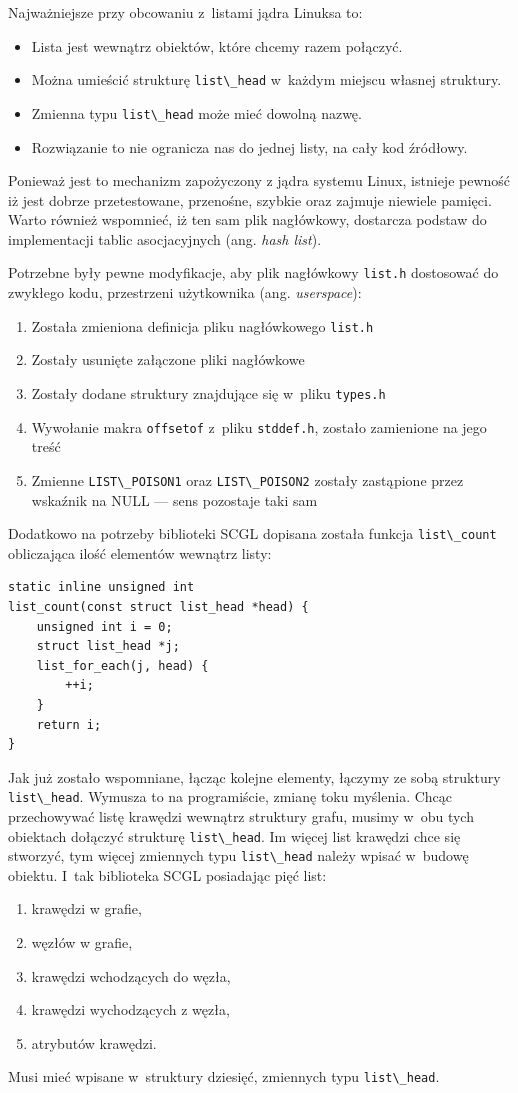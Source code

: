 \documentclass[a4paper,12pt,polish,oneside]{thesis}
\newcommand\code[1]{\lstinline[style=line]{#1}}
\begin{document}
Najważniejsze przy obcowaniu z~listami jądra Linuksa to:
\begin{itemize}
	\item Lista jest wewnątrz obiektów, które chcemy razem połączyć.
	\item Można umieścić strukturę \code{list\_head} w~każdym miejscu własnej struktury.
	\item Zmienna typu \code{list\_head} może mieć dowolną nazwę.
	\item Rozwiązanie to nie ogranicza nas do jednej listy, na cały kod źródłowy.
\end{itemize}
Ponieważ jest to mechanizm zapożyczony z jądra systemu Linux, istnieje pewność iż jest dobrze przetestowane, przenośne, szybkie oraz zajmuje niewiele pamięci.
Warto również wspomnieć, iż ten sam plik nagłówkowy, dostarcza podstaw do implementacji tablic asocjacyjnych (ang. \emph{hash list}).

Potrzebne były pewne modyfikacje, aby plik nagłówkowy \code{list.h} dostosować do zwykłego kodu, przestrzeni użytkownika (ang. \emph{userspace}):
\begin{enumerate}
	\item Została zmieniona definicja pliku nagłówkowego \code{list.h}
	\item Zostały usunięte załączone pliki nagłówkowe
	\item Zostały dodane struktury znajdujące się w~pliku \code{types.h}
	\item Wywołanie makra \code{offsetof} z~pliku \code{stddef.h}, zostało zamienione na jego treść
	\item Zmienne \code{LIST\_POISON1} oraz \code{LIST\_POISON2} zostały zastąpione przez wskaźnik na NULL --- sens pozostaje taki sam
\end{enumerate}
Dodatkowo na potrzeby biblioteki SCGL dopisana została funkcja \code{list\_count} obliczająca ilość elementów wewnątrz listy:
\begin{lstlisting}[style=code,caption=Ciało funkcji {list\_count}]
static inline unsigned int
list_count(const struct list_head *head) {
	unsigned int i = 0;
	struct list_head *j;
	list_for_each(j, head) {
		++i;
	}
	return i;
}
\end{lstlisting}

Jak już zostało wspomniane, łącząc kolejne elementy, łączymy ze sobą struktury \code{list\_head}.
Wymusza to na programiście, zmianę toku myślenia.
Chcąc przechowywać listę krawędzi wewnątrz struktury grafu, musimy w~obu tych obiektach dołączyć strukturę \code{list\_head}.
Im więcej list krawędzi chce się stworzyć, tym więcej zmiennych typu \code{list\_head} należy wpisać w~budowę obiektu.
I~tak biblioteka SCGL posiadając pięć list:
\begin{enumerate}
	\item krawędzi w grafie,
	\item węzłów w grafie,
	\item krawędzi wchodzących do węzła,
	\item krawędzi wychodzących z węzła,
	\item atrybutów krawędzi.
\end{enumerate}
Musi mieć wpisane w~struktury dziesięć, zmiennych typu \code{list\_head}.
\end{document}
